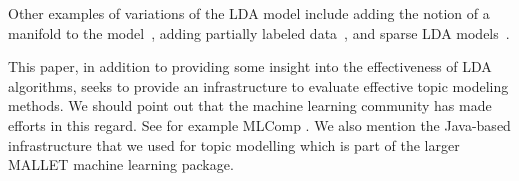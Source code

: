Other examples of variations of the LDA model include adding the
notion of a manifold to the model~\cite{DTM}, adding partially labeled
data~\cite{Partial}, and sparse LDA models~\cite{MimnoSparse}. 

This paper, in addition to providing some insight into the
effectiveness of LDA algorithms, seeks to provide an infrastructure to
evaluate effective topic modeling methods. We should point out that
the machine learning community has made efforts in this regard.  See
for example MLComp \cite{MLComp}. We also mention the Java-based
infrastructure that we used for topic modelling \cite{McCallumMALLET}
which is part of the larger MALLET machine learning package.
